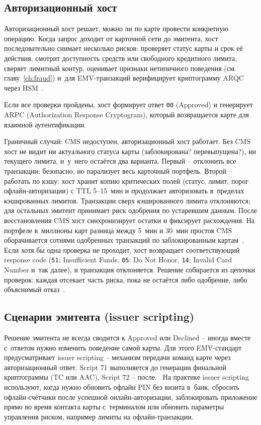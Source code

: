 \subsection*{Авторизационный хост}

Авторизационный хост решает, можно ли по карте провести конкретную
операцию. Когда запрос доходит от карточной сети до эмитента, хост
последовательно снимает несколько рисков: проверяет статус карты и
срок её действия, смотрит доступность средств или свободного
кредитного лимита, сверяет лимитный контур, оценивает признаки
нетипичного поведения (см. главу~\ref{ch:fraud}) и~для EMV-транзакций
верифицирует криптограмму ARQC через HSM~\cite{emvco-book2,emvco-book3}.

Если все проверки пройдены, хост формирует ответ \texttt{00}
(Approved) и генерирует ARPC (Authorization Response Cryptogram),
который возвращается карте для взаимной аутентификации.

Граничный случай: CMS недоступен, авторизационный хост работает.
Без CMS хост не видит ни актуального статуса карты (заблокирована?
перевыпущена?), ни текущего лимита, и~у~него остаётся два варианта.
Первый -- отклонить все транзакции: безопасно, но парализует весь
карточный портфель. Второй -- работать по кэшу: хост хранит копию
критических полей (статус, лимит, порог офлайн-авторизации) с TTL
5--15~мин и продолжает авторизовать в~пределах кэшированных лимитов.
Транзакции сверх кэшированного лимита отклоняются; для остальных
эмитент принимает риск одобрения по устаревшим данным. После
восстановления CMS хост синхронизирует остатки и фиксирует
расхождения. На портфеле в~миллионы карт разница между 5~мин и
30~мин простоя CMS оборачивается сотнями одобренных транзакций
по заблокированным картам~\cite{emvco-book3}. Если хотя бы одна
проверка не проходит, хост возвращает соответствующий response code
(\texttt{51}: Insufficient Funds, \texttt{05}: Do Not Honor,
\texttt{14}: Invalid Card Number и~так далее), и транзакция
отклоняется. Решение собирается из цепочки проверок: каждая
отсекает часть риска, пока не остаётся либо одобрение, либо
объяснимый отказ~\cite{emvco-book3}.

\subsection*{Сценарии эмитента (issuer scripting)}

Решение эмитента не всегда сводится к Approved или Declined --
иногда вместе с~ответом нужно изменить поведение самой карты.
Для этого EMV-стандарт предусматривает issuer scripting --
механизм передачи команд карте через авторизационный ответ.
Script 71 выполняется до генерации финальной криптограммы
(TC или AAC), Script 72 -- после.~\cite{emvco-book3} На практике
issuer scripting используют, когда нужно обновить офлайн PIN без
визита в~банк, сбросить офлайн-счётчики после успешной онлайн-авторизации,
заблокировать приложение прямо во время контакта карты с~терминалом
или обновить параметры управления риском, например лимиты на
офлайн-транзакции.

